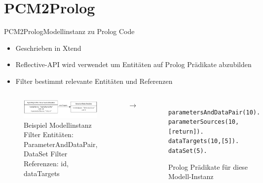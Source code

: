 \documentclass{sdqbeamer}
\begin{document}
\section{PCM2Prolog}
\begin{frame}{PCM2Prolog}{Modellinstanz zu Prolog Code}
	\begin{itemize}
		\item Geschrieben in Xtend
		\item Reflective-API wird verwendet um Entitäten auf Prolog Prädikate abzubilden
		\item Filter bestimmt relevante Entitäten und Referenzen
	\end{itemize}
\vspace{0.05\textheight}	
	\begin{columns}
		\centering
		\begin{figure}
			\includegraphics[width=\textwidth]{images/pcm2prologUml.pdf}
			\caption{Beispiel Modellinstanz \linebreak Filter Entitäten: ParameterAndDataPair, DataSet \linebreak Filter Referenzen: id, dataTargets}
		\end{figure}
		\centering
		\LARGE{$\rightarrow$}
		\begin{figure}\raggedright 
		\texttt{parametersAndDataPair(10).\\
			parameterSources(10,[return]).\\
			dataTargets(10,[5]).\\ \vspace{0.025\textheight}
			dataSet(5).}
		\caption{Prolog Prädikate für diese Modell-Instanz}
		\end{figure}
	\end{columns}
\end{frame}	
\end{document}
